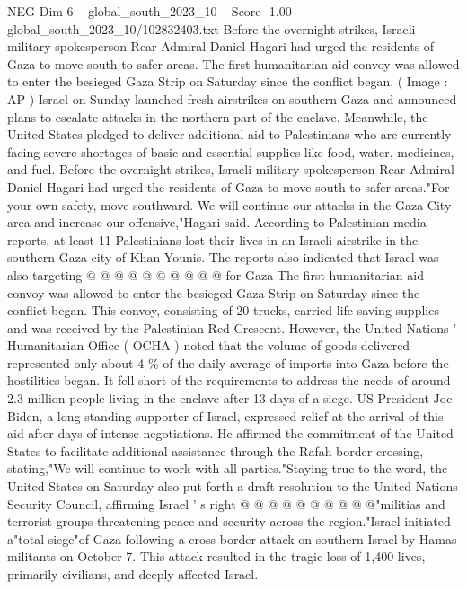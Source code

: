 \begin{textsample}{NEG Dim 6 – global\_south\_2023\_10 – Score -1.00 – global\_south\_2023\_10/102832403.txt}  \label{ex:f6_neg_213}
Before the overnight strikes, Israeli military spokesperson Rear Admiral Daniel Hagari had urged the residents of Gaza to move south to safer areas.
The first humanitarian aid convoy was allowed to enter the besieged Gaza Strip on Saturday since the conflict began. ( Image : AP ) Israel on Sunday launched fresh airstrikes on southern Gaza and announced plans to escalate attacks in the northern part of the enclave.
Meanwhile, the United States pledged to deliver additional aid to Palestinians who are currently facing severe shortages of basic and essential supplies like food, water, medicines, and fuel.
Before the overnight strikes, Israeli military spokesperson Rear Admiral Daniel Hagari had urged the residents of Gaza to move south to safer areas."For your own safety, move southward.
We will continue our attacks in the Gaza City area and increase our offensive,"Hagari said.
According to Palestinian media reports, at least 11 Palestinians lost their lives in an Israeli airstrike in the southern Gaza city of Khan Younis.
The reports also indicated that Israel was also targeting @ @ @ @ @ @ @ @ @ @ for Gaza The first humanitarian aid convoy was allowed to enter the besieged Gaza Strip on Saturday since the conflict began.
This convoy, consisting of 20 trucks, carried life-saving supplies and was received by the Palestinian Red Crescent.
However, the United Nations ' Humanitarian Office ( OCHA ) noted that the volume of goods delivered represented only about 4 \% of the daily average of imports into Gaza before the hostilities began.
It fell short of the requirements to address the needs of around 2.3 million people living in the enclave after 13 days of a siege.
US President Joe Biden, a long-standing supporter of Israel, expressed relief at the arrival of this aid after days of intense negotiations.
He affirmed the commitment of the United States to facilitate additional assistance through the Rafah border crossing, stating,"We will continue to work with all parties."Staying true to the word, the United States on Saturday also put forth a draft resolution to the United Nations Security Council, affirming Israel ' s right @ @ @ @ @ @ @ @ @ @"militias and terrorist groups threatening peace and security across the region."Israel initiated a"total siege"of Gaza following a cross-border attack on southern Israel by Hamas militants on October 7.
This attack resulted in the tragic loss of 1,400 lives, primarily civilians, and deeply affected Israel.

\end{textsample}
